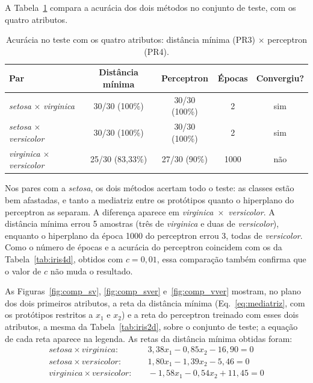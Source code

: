 \documentclass[12pt,a4paper]{article}
\begin{document}
A Tabela~\ref{tab:comparacao} compara a acurácia dos dois métodos no conjunto de teste, com os quatro atributos.

\begin{table}[H]
\centering
\caption{Acurácia no teste com os quatro atributos: distância mínima (PR3) $\times$ perceptron (PR4).}
\label{tab:comparacao}
\begin{tabular}{lcccc}
\toprule
Par & Distância mínima & Perceptron & Épocas & Convergiu? \\
\midrule
\emph{setosa} $\times$ \emph{virginica}     & 30/30 (100\%)   & 30/30 (100\%) & 2    & sim \\
\emph{setosa} $\times$ \emph{versicolor}    & 30/30 (100\%)   & 30/30 (100\%) & 2    & sim \\
\emph{virginica} $\times$ \emph{versicolor} & 25/30 (83,33\%) & 27/30 (90\%)  & 1000 & não \\
\bottomrule
\end{tabular}
\end{table}

Nos pares com a \emph{setosa}, os dois métodos acertam todo o teste: as classes estão bem afastadas, e tanto a mediatriz entre os protótipos quanto o hiperplano do perceptron as separam. A diferença aparece em \emph{virginica}~$\times$~\emph{versicolor}. A distância mínima errou 5 amostras (três de \emph{virginica} e duas de \emph{versicolor}), enquanto o hiperplano da época 1000 do perceptron errou 3, todas de \emph{versicolor}. Como o número de épocas e a acurácia do perceptron coincidem com os da Tabela~\ref{tab:iris4d}, obtidos com $c = 0{,}01$, essa comparação também confirma que o valor de $c$ não muda o resultado.

As Figuras~\ref{fig:comp_sv}, \ref{fig:comp_sver} e~\ref{fig:comp_vver} mostram, no plano dos dois primeiros atributos, a reta da distância mínima (Eq.~\eqref{eq:mediatriz}, com os protótipos restritos a $x_1$ e $x_2$) e a reta do perceptron treinado com esses dois atributos, a mesma da Tabela~\ref{tab:iris2d}, sobre o conjunto de teste; a equação de cada reta aparece na legenda. As retas da distância mínima obtidas foram:
\begin{align*}
\textit{setosa} \times \textit{virginica}:&\quad 3{,}38x_1 - 0{,}85x_2 - 16{,}90 = 0\\
\textit{setosa} \times \textit{versicolor}:&\quad 1{,}80x_1 - 1{,}39x_2 - 5{,}46 = 0\\
\textit{virginica} \times \textit{versicolor}:&\quad -1{,}58x_1 - 0{,}54x_2 + 11{,}45 = 0
\end{align*}
\end{document}
